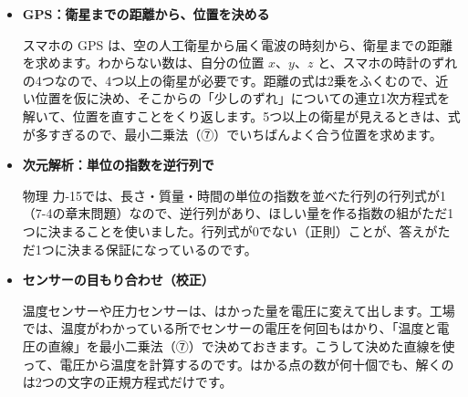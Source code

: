 \begin{butsuri}
\begin{itemize}[leftmargin=1.2\zw, itemsep=3pt, topsep=0pt, label={\color{bkPurple}●}]
\item \textbf{GPS：衛星までの距離から、位置を決める}\par\noindent\begin{minipage}[c]{0.70\linewidth}
スマホの GPS は、空の人工衛星から届く電波の時刻から、衛星までの距離を求めます。わからない数は、自分の位置 $x$、$y$、$z$ と、スマホの時計のずれの4つなので、4つ以上の衛星が必要です。距離の式は2乗をふくむので、近い位置を仮に決め、そこからの「少しのずれ」についての連立1次方程式を解いて、位置を直すことをくり返します。5つ以上の衛星が見えるときは、式が多すぎるので、最小二乗法（⑦）でいちばんよく合う位置を求めます。
\end{minipage}\hfill
\begin{minipage}[c]{0.27\linewidth}\centering
{}
\end{minipage}
\item \textbf{次元解析：単位の指数を逆行列で}\par\noindent 物理 力-15では、長さ・質量・時間の単位の指数を並べた行列の行列式が1（7-4の章末問題）なので、逆行列があり、ほしい量を作る指数の組がただ1つに決まることを使いました。行列式が0でない（正則）ことが、答えがただ1つに決まる保証になっているのです。
\item \textbf{センサーの目もり合わせ（校正）}\par\noindent 温度センサーや圧力センサーは、はかった量を電圧に変えて出します。工場では、温度がわかっている所でセンサーの電圧を何回もはかり、「温度と電圧の直線」を最小二乗法（⑦）で決めておきます。こうして決めた直線を使って、電圧から温度を計算するのです。はかる点の数が何十個でも、解くのは2つの文字の正規方程式だけです。
\end{itemize}
\end{butsuri}

\bkendproblems
{}


